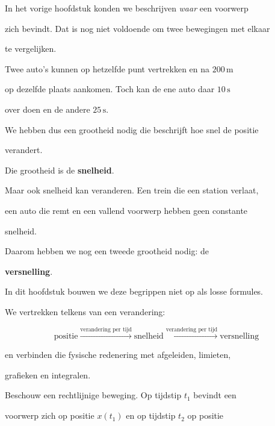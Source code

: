 \documentclass{ximera}
\begin{document}




In het vorige hoofdstuk konden we beschrijven \emph{waar} een voorwerp

zich bevindt. Dat is nog niet voldoende om twee bewegingen met elkaar

te vergelijken.

Twee auto's kunnen op hetzelfde punt vertrekken en na $200\,\mathrm{m}$

op dezelfde plaats aankomen. Toch kan de ene auto daar $10\,\mathrm{s}$

over doen en de andere $25\,\mathrm{s}$.

We hebben dus een grootheid nodig die beschrijft hoe snel de positie

verandert.

Die grootheid is de \textbf{snelheid}.

Maar ook snelheid kan veranderen. Een trein die een station verlaat,

een auto die remt en een vallend voorwerp hebben geen constante

snelheid.

Daarom hebben we nog een tweede grootheid nodig: de

\textbf{versnelling}.

In dit hoofdstuk bouwen we deze begrippen niet op als losse formules.

We vertrekken telkens van een verandering:

\[\boxed{ \text{positie} \xrightarrow{\text{verandering per tijd}} \text{snelheid} \xrightarrow{\text{verandering per tijd}} \text{versnelling} }\]

en verbinden die fysische redenering met afgeleiden, limieten,

grafieken en integralen.





Beschouw een rechtlijnige beweging. Op tijdstip $t_1$ bevindt een

voorwerp zich op positie $x(t_1)$ en op tijdstip $t_2$ op positie
\end{document}
